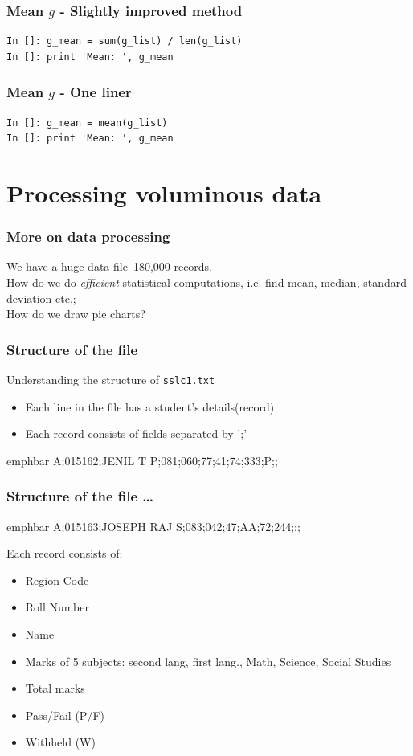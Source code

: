 \documentclass[14pt,compress]{beamer}
\newcommand{\emphbar}[1]
{\begin{beamercolorbox}[rounded=true]{emphbar} 
      {#1}
 \end{beamercolorbox}
}
\newcounter{time}
\newcommand{\inctime}[1]{\addtocounter{time}{#1}{\tiny \thetime\ m}}
\newcommand{\typ}[1]{\lstinline{#1}}
\begin{document}
\begin{frame}[fragile]
  \frametitle{Mean $g$ - Slightly improved method}
  \begin{lstlisting}
In []: g_mean = sum(g_list) / len(g_list)
In []: print 'Mean: ', g_mean
  \end{lstlisting}
\end{frame}

\begin{frame}[fragile]
  \frametitle{Mean $g$ - One liner}
  \begin{lstlisting}
In []: g_mean = mean(g_list)
In []: print 'Mean: ', g_mean
  \end{lstlisting}
  \inctime{10}
\end{frame}

\section{Processing voluminous data}
\begin{frame}
  \frametitle{More on data processing}
  \begin{block}{}
    We have a huge data file--180,000 records.\\How do we do
    \emph{efficient} statistical computations, i.e. find mean, median,
    standard deviation etc.;\\How do we draw pie charts?
  \end{block}
\end{frame}

\begin{frame}
  \frametitle{Structure of the file}
  Understanding the structure of \typ{sslc1.txt}
  \begin{itemize}
    \item Each line in the file has a student's details(record)
    \item Each record consists of fields separated by ';'
  \end{itemize}
\emphbar{A;015162;JENIL T P;081;060;77;41;74;333;P;;}
\end{frame}

\begin{frame}
  \frametitle{Structure of the file \ldots}
\emphbar{A;015163;JOSEPH RAJ S;083;042;47;AA;72;244;;;}
  Each record consists of:
  \begin{itemize}
    \item Region Code
    \item Roll Number
    \item Name
    \item Marks of 5 subjects: second lang, first lang., Math, Science,
        Social Studies
    \item Total marks
    \item Pass/Fail (P/F)
    \item Withheld (W)
  \end{itemize}
  \inctime{5}
\end{frame}
\end{document}
